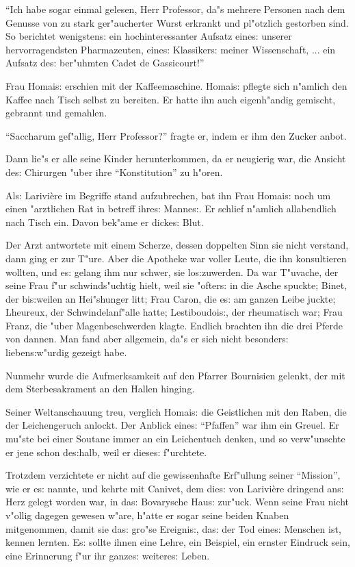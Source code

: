 \documentclass[oneside,12pt]{book}
\newenvironment{antiqua}{\normalfont}{}%
\newcommand{\s}{s:}%
\begin{document}
"`Ich habe sogar einmal gelesen, Herr Professor, da"s mehrere
Personen nach dem Genusse von zu stark ger"aucherter Wurst
erkrankt und pl"otzlich gestorben sind. So berichtet wenigsten{\s}
ein hochinteressanter Aufsatz eine{\s} unserer hervorragendsten
Pharmazeuten, eine{\s} Klassiker{\s} meiner Wissenschaft, ... ein
Aufsatz de{\s} ber"uhmten Cadet de Gassicourt!"'

Frau Homai{\s} erschien mit der Kaffeemaschine. Homai{\s} pflegte
sich n"amlich den Kaffee nach Tisch selbst zu bereiten. Er hatte
ihn auch eigenh"andig gemischt, gebrannt und gemahlen.

"`\begin{antiqua}Saccharum\end{antiqua} gef"allig, Herr
Professor?"' fragte er, indem er ihm den Zucker anbot.

Dann lie"s er alle seine Kinder herunterkommen, da er neugierig
war, die Ansicht de{\s} Chirurgen "uber ihre "`Konstitution"' zu
h"oren.

Al{\s} Larivi\`ere im Begriffe stand aufzubrechen, bat ihn Frau
Homai{\s} noch um einen "arztlichen Rat in betreff ihre{\s}
Manne{\s}. Er schlief n"amlich allabendlich nach Tisch ein. Davon
bek"ame er dicke{\s} Blut.

Der Arzt antwortete mit einem Scherze, dessen doppelten Sinn sie
nicht verstand, dann ging er zur T"ure. Aber die Apotheke war
voller Leute, die ihn konsultieren wollten, und e{\s} gelang ihm
nur schwer, sie lo{\s}zuwerden. Da war T"uvache, der seine Frau
f"ur schwinds"uchtig hielt, weil sie "ofter{\s} in die Asche
spuckte; Binet, der bi{\s}weilen an Hei"shunger litt; Frau Caron,
die e{\s} am ganzen Leibe juckte; Lheureux, der Schwindelanf"alle
hatte; Lestiboudoi{\s}, der rheumatisch war; Frau Franz, die "uber
Magenbeschwerden klagte. Endlich brachten ihn die drei Pferde von
dannen. Man fand aber allgemein, da"s er sich nicht besonder{\s}
lieben{\s}w"urdig gezeigt habe.

Nunmehr wurde die Aufmerksamkeit auf den Pfarrer Bournisien
gelenkt, der mit dem Sterbesakrament an den Hallen hinging.

Seiner Weltanschauung treu, verglich Homai{\s} die Geistlichen mit
den Raben, die der Leichengeruch anlockt. Der Anblick eine{\s}
"`Pfaffen"' war ihm ein Greuel. Er mu"ste bei einer Soutane immer
an ein Leichentuch denken, und so verw"unschte er jene schon
de{\s}halb, weil er diese{\s} f"urchtete.

Trotzdem verzichtete er nicht auf die gewissenhafte Erf"ullung
seiner "`Mission"', wie er e{\s} nannte, und kehrte mit Canivet,
dem die{\s} von Larivi\`ere dringend an{\s} Herz gelegt worden
war, in da{\s} Bovarysche Hau{\s} zur"uck. Wenn seine Frau nicht
v"ollig dagegen gewesen w"are, h"atte er sogar seine beiden Knaben
mitgenommen, damit sie da{\s} gro"se Ereigni{\s}, da{\s} der Tod
eine{\s} Menschen ist, kennen lernten. E{\s} sollte ihnen eine
Lehre, ein Beispiel, ein ernster Eindruck sein, eine Erinnerung
f"ur ihr ganze{\s} weitere{\s} Leben.
\end{document}
